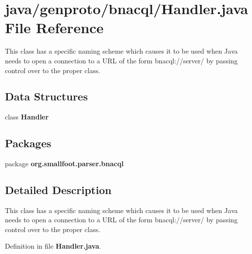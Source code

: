 \section{java/genproto/bnacql/\+Handler.java File Reference}
\label{bnacql_2Handler_8java}


This class has a specific naming scheme which causes it to be used when Java needs to open a connection to a U\+R\+L of the form bnacql\+://server/ by passing control over to the proper class.  


\subsection*{Data Structures}
\begin{DoxyCompactItemize}
\item 
class {\bf Handler}
\end{DoxyCompactItemize}
\subsection*{Packages}
\begin{DoxyCompactItemize}
\item 
package {\bf org.\+smallfoot.\+parser.\+bnacql}
\end{DoxyCompactItemize}


\subsection{Detailed Description}
This class has a specific naming scheme which causes it to be used when Java needs to open a connection to a U\+R\+L of the form bnacql\+://server/ by passing control over to the proper class. 



Definition in file {\bf Handler.\+java}.

